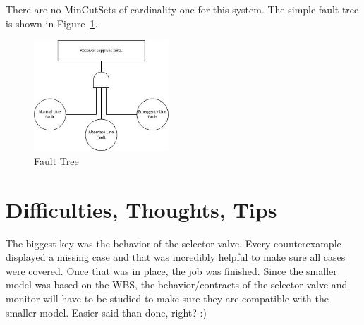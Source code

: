 \documentclass{article}
\begin{document}
There are no MinCutSets of cardinality one for this system. The simple fault tree is shown in Figure~\ref{fig:ft}.

\begin{figure}[h]
\begin{center}
\includegraphics[width=0.45\textwidth]{images/ft} 
\caption{Fault Tree}
\label{fig:ft}
\end{center}
\end{figure}


\section{Difficulties, Thoughts, Tips}
The biggest key was the behavior of the selector valve. Every counterexample displayed a missing case and that was incredibly helpful to make sure all cases were covered. Once that was in place, the job was finished. Since the smaller model was based on the WBS, the behavior/contracts of the selector valve and monitor will have to be studied to make sure they are compatible with the smaller model. Easier said than done, right? :)


















\end{document}
